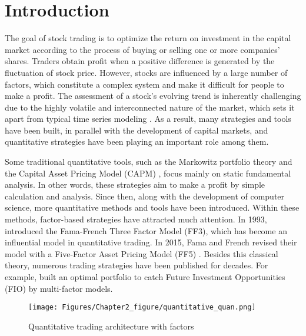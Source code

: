 \documentclass[preprint,12pt]{elsarticle}
\begin{document}
\section{Introduction}
The goal of stock trading is to optimize the return on investment in the capital market according to the process of buying or selling one or more companies' shares. Traders obtain profit when a positive difference is generated by the fluctuation of stock price. However, stocks are influenced by a large number of factors, which constitute a complex system and make it difficult for people to make a profit. The assessment of a stock's evolving trend is inherently challenging due to the highly volatile and interconnected nature of the market, which sets it apart from typical time series modeling \citep{wang2022adaptive}. As a result, many strategies and tools have been built, in parallel with the development of capital markets, and quantitative strategies have been playing an important role among them. 







Some traditional quantitative tools, such as the Markowitz portfolio theory \citep{markowitz1952} and the
Capital Asset Pricing Model (CAPM) \citep{Sharpe}, focus mainly on static fundamental analysis. In other words, these strategies aim to make a profit by simple calculation and analysis. Since then, along with the development of computer science, more quantitative methods and tools have been introduced. Within these methods, factor-based strategies have attracted much attention. In 1993, \citet{fama1993common} introduced the Fama-French Three Factor Model (FF3), which has become an influential model in quantitative trading. In 2015, Fama and French revised their model with a Five-Factor Asset Pricing Model (FF5) \citep{fama2015five}. Besides this classical theory, numerous trading strategies have been published for decades. For example, \citet{shi2024dynamic} built an optimal
portfolio to catch Future Investment Opportunities (FIO) by multi-factor models.


\begin{figure}[ht]
\centerline{\texttt{[image: Figures/Chapter2\_figure/quantitative\_quan.png]}}
\caption{Quantitative trading architecture with factors}
\label{Quantitative Trading1}
\end{figure}
\end{document}
